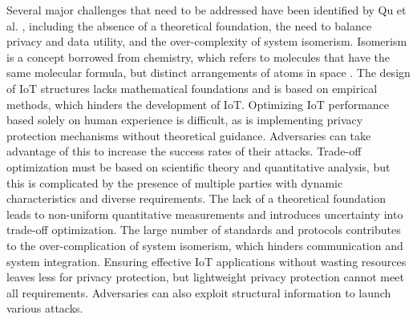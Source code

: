 Several major challenges that need to be addressed have been identified by
Qu et al. \cite{Qu2018Privacy}, including the absence of a theoretical foundation,
the need to balance privacy and data utility, and the over-complexity of system
isomerism. Isomerism is a concept borrowed from chemistry, which refers to
molecules that have the same molecular formula, but distinct arrangements of
atoms in space \cite{petrucci2023general}. The design of IoT structures lacks
mathematical foundations and is based on empirical methods, which hinders
the development of IoT. Optimizing IoT performance based solely on human experience
is difficult, as is implementing privacy protection mechanisms without theoretical
guidance. Adversaries can take advantage of this to increase the success rates
of their attacks. Trade-off optimization must be based on scientific theory
and quantitative analysis, but this is complicated by the presence of multiple
parties with dynamic characteristics and diverse requirements. The lack of a
theoretical foundation leads to non-uniform quantitative measurements and introduces
uncertainty into trade-off optimization. The large number of standards and protocols
contributes to the over-complication of system isomerism, which hinders communication
and system integration. Ensuring effective IoT applications without wasting resources
leaves less for privacy protection, but lightweight privacy protection cannot
meet all requirements. Adversaries can also exploit structural information to
launch various attacks.

